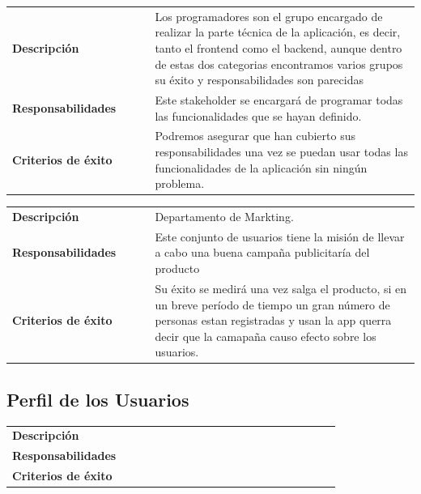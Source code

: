 \documentclass[11pt]{article}
\begin{document}
\begin{table}[H]
  \centering
  \begin{tabular}{p{0.35\linewidth}|p{0.65\linewidth}}
    \toprule
    \textbf{Descripción} & Los programadores son el grupo encargado de realizar la parte técnica de la aplicación, es decir, tanto el frontend como el backend, aunque dentro de estas dos categorias encontramos varios grupos su éxito y responsabilidades son parecidas\\ 
    \textbf{Responsabilidades} & Este stakeholder se encargará de programar todas las funcionalidades que se hayan definido. \\
    \textbf{Criterios de éxito} & Podremos asegurar que han cubierto sus responsabilidades una vez se puedan usar todas las funcionalidades de la aplicación sin ningún problema. \\
    \bottomrule
  \end{tabular}
\end{table}

\begin{table}[H]
  \centering
  \begin{tabular}{p{0.35\linewidth}|p{0.65\linewidth}}
    \toprule
    \textbf{Descripción} & Departamento de Markting.\\ 
    \textbf{Responsabilidades} & Este conjunto de usuarios tiene la misión de llevar a cabo una buena campaña publicitaría del producto \\
    \textbf{Criterios de éxito} & Su éxito se medirá una vez salga el producto, si en un breve período de tiempo un gran número de personas estan registradas y usan la app querra decir que la camapaña causo efecto sobre los usuarios. \\
    \bottomrule
  \end{tabular}
\end{table}

\subsection{Perfil de los Usuarios}
\begin{table}[H]
  \centering
  \begin{tabular}{p{0.35\linewidth}|p{0.65\linewidth}}
    \toprule
    \textbf{Descripción} &\\
    \textbf{Responsabilidades} &  \\
    \textbf{Criterios de éxito} &  \\
    \bottomrule
  \end{tabular}
\end{table}
\end{document}
